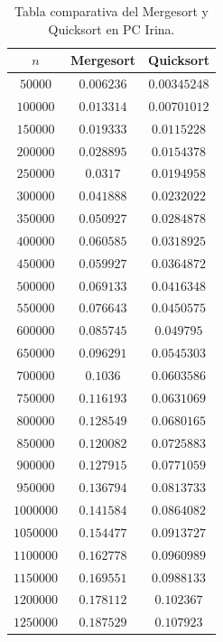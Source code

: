 \documentclass[12pt]{article}
\begin{document}
    \begin{table}
        \centering
        \begin{tabular}{|c|c|c|}
            \hline
            $n$ & Mergesort & Quicksort \\
            \hline
            $50000$   & $0.006236$ & $0.00345248$ \\
            $100000$  & $0.013314$ & $0.00701012$ \\
            $150000$  & $0.019333$ & $0.0115228$ \\
            $200000$  & $0.028895$ & $0.0154378$ \\
            $250000$  & $0.0317$ & $0.0194958$ \\
            $300000$  & $0.041888$ & $0.0232022$ \\
            $350000$  & $0.050927$ & $0.0284878$ \\
            $400000$  & $0.060585$ & $0.0318925$ \\
            $450000$  & $0.059927$ & $0.0364872$ \\
            $500000$  & $0.069133$ & $0.0416348$ \\
            $550000$  & $0.076643$ & $0.0450575$ \\
            $600000$  & $0.085745$ & $0.049795$ \\
            $650000$  & $0.096291$ & $0.0545303$ \\
            $700000$  & $0.1036$ & $0.0603586$ \\
            $750000$  & $0.116193$ & $0.0631069$ \\
            $800000$  & $0.128549$ & $0.0680165$ \\
            $850000$  & $0.120082$ & $0.0725883$ \\
            $900000$  & $0.127915$ & $0.0771059$ \\
            $950000$  & $0.136794$ & $0.0813733$ \\
            $1000000$ & $0.141584$ & $0.0864082$ \\
            $1050000$ & $0.154477$ & $0.0913727$ \\
            $1100000$ & $0.162778$ & $0.0960989$ \\
            $1150000$ & $0.169551$ & $0.0988133$ \\
            $1200000$ & $0.178112$ & $0.102367$ \\
            $1250000$ & $0.187529$ & $0.107923$ \\
            \hline
        \end{tabular}
        \caption{Tabla comparativa del Mergesort y Quicksort en PC Irina.}
        \label{tab:merge_quick}
    \end{table}
\end{document}
